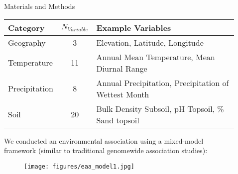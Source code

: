 \documentclass[final]{beamer}
\newlength{\sepwid}
\newlength{\onecolwid}
\newlength{\twocolwid}
\begin{document}
\begin{frame}[t]
\begin{columns}[t]
\begin{column}{\onecolwid}
\begin{block}{Materials and Methods}
\begin{table}[!h]
\centering
\begin{tabular}{lcl}
\toprule
\textbf{Category} & \textbf{$N_{Variable}$} & \textbf{Example Variables}\\
\midrule
Geography & 3 & Elevation, Latitude, Longitude\\
Temperature & 11 & Annual Mean Temperature, Mean Diurnal
Range\\
Precipitation & 8 & Annual Precipitation, Precipitation of
Wettest Month\\
Soil & 20 & Bulk Density Subsoil, pH Topsoil, \% Sand topsoil\\
\bottomrule
\end{tabular}
\end{table}

\vspace{2cm}

We conducted an environmental association using a mixed-model framework (similar to traditional genomewide association studies):


\begin{figure}
  \begin{center}
    \texttt{[image: figures/eaa\_model1.jpg]}
  \end{center}
\end{figure}


\end{block}




\end{column} %



\begin{column}{\sepwid}\end{column} %

\begin{column}{\twocolwid} %



\end{column}
\end{columns}
\end{frame}
\end{document}
